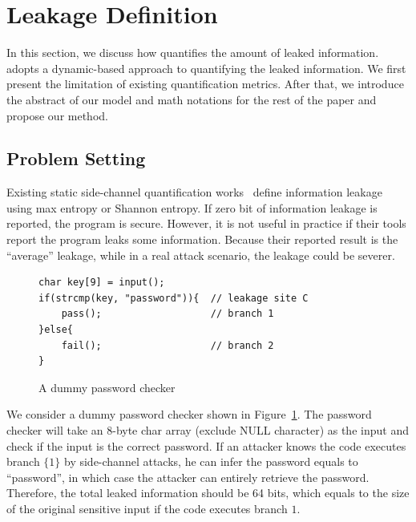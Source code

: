 \section{\tool{} Leakage Definition}
\label{sec:trace-qif}
In this section, we discuss how \tool{} quantifies the amount of leaked
information. \tool{} adopts a dynamic-based approach to quantifying the leaked
information. We first present the limitation of existing quantification metrics.
After that, we introduce the abstract of our model and math notations for the
rest of the paper and propose our method.

\subsection{Problem Setting}
Existing static side-channel quantification
works~\cite{182946,Wichelmann:2018:MFF:3274694.3274741 } define information
leakage using max entropy or Shannon entropy.  If zero bit of
information leakage is reported, the program is secure. However, it is not
useful in practice if their tools report the program leaks some information.
Because their reported result is the ``average'' leakage, while in a real attack
scenario, the leakage could be severer.


\begin{figure}[h!]
    \centering
    \begin{lstlisting}[xleftmargin=.03\textwidth,xrightmargin=.01\textwidth]
char key[9] = input();
if(strcmp(key, "password")){  // leakage site C
    pass();                   // branch 1
}else{
    fail();                   // branch 2
}
\end{lstlisting}
\vspace*{-9pt}
    \caption{A dummy password checker}
    \label{fig:password-checker}
\end{figure}

We consider a dummy password checker shown in Figure~\ref{fig:password-checker}.
The password checker will take an 8-byte char array (exclude \textsf{NULL} character) as the input and check if
the input is the correct password. If an attacker knows the code executes branch
$\{{1\}}$ by side-channel attacks, he can infer the password equals to
``password'', in which case the attacker can entirely retrieve the password.
Therefore, the total leaked information should be 64 bits, which equals to the
size of the original sensitive input if the code executes branch
$1$.

